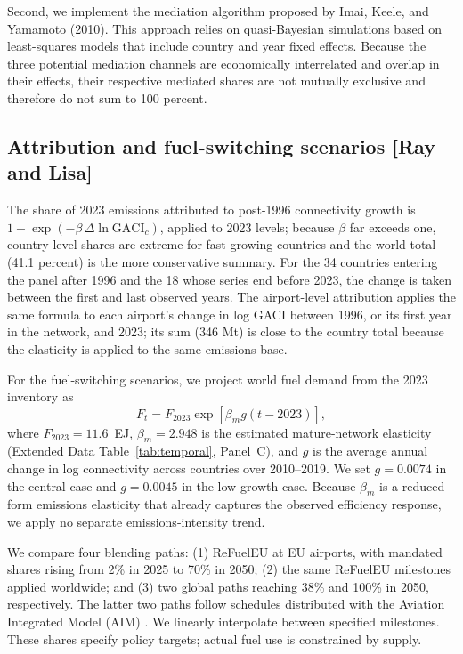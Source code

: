 \documentclass[12pt]{extarticle}
\begin{document}
Second, we implement the mediation algorithm proposed by Imai, Keele, and Yamamoto (2010). This approach relies on quasi-Bayesian simulations based on least-squares models that include country and year fixed effects. Because the three potential mediation channels are economically interrelated and overlap in their effects, their respective mediated shares are not mutually exclusive and therefore do not sum to 100 percent.



\subsection*{Attribution and fuel-switching scenarios [Ray and Lisa]}
The share of 2023 emissions attributed to post-1996 connectivity growth is
$1 - \exp(-\beta\,\Delta \ln \mathrm{GACI}_c)$, applied to 2023 levels;
because $\beta$ far exceeds one, country-level shares are extreme for
fast-growing countries and the world total (41.1 percent) is the more
conservative summary. For the 34 countries entering the panel after 1996 and the 18 whose series end before 2023, the change is taken between the first and last observed years. The airport-level attribution applies the same
formula to each airport's change in log GACI between 1996, or its first
year in the network, and 2023; its sum (346 Mt) is close to the country
total because the elasticity is applied to the same emissions base. 

For the fuel-switching scenarios, we project world fuel demand from the
2023 inventory as
\begin{equation}
F_t=F_{2023}\exp[\beta_m g(t-2023)],
\end{equation}
where $F_{2023}=11.6$~EJ, $\beta_m=2.948$ is the estimated
mature-network elasticity (Extended Data Table~\ref{tab:temporal},
Panel~C), and $g$ is the average annual change in log connectivity
across countries over 2010--2019. We set $g=0.0074$ in the central
case and $g=0.0045$ in the low-growth case. Because $\beta_m$ is a
reduced-form emissions elasticity that already captures the observed
efficiency response, we apply no separate emissions-intensity trend.

We compare four blending paths: (1) ReFuelEU at EU airports, with mandated shares rising from 2\% in 2025 to 70\% in 2050; (2) the same ReFuelEU milestones applied worldwide; and (3) two global paths reaching 38\% and 100\% in 2050, respectively. The latter two paths follow schedules distributed with the Aviation Integrated Model (AIM) \citep{dray2022}. We linearly interpolate between specified milestones. These shares specify policy targets; actual fuel use is constrained by supply.
\end{document}
